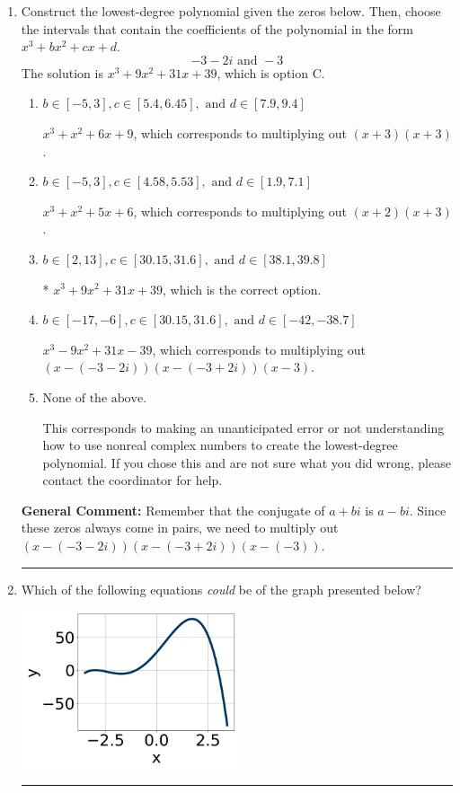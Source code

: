\documentclass{extbook}[14pt]
\newcommand{\litem}[1]{\item #1

\rule{\textwidth}{0.4pt}}
\begin{document}
\begin{enumerate}\litem{
Construct the lowest-degree polynomial given the zeros below. Then, choose the intervals that contain the coefficients of the polynomial in the form $x^3+bx^2+cx+d$.
\[ -3 - 2 i \text{ and } -3 \]The solution is \( x^{3} +9 x^{2} +31 x + 39 \), which is option C.\begin{enumerate}[label=\Alph*.]
\item \( b \in [-5, 3], c \in [5.4, 6.45], \text{ and } d \in [7.9, 9.4] \)

$x^{3} + x^{2} +6 x + 9$, which corresponds to multiplying out $(x + 3)(x + 3)$.
\item \( b \in [-5, 3], c \in [4.58, 5.53], \text{ and } d \in [1.9, 7.1] \)

$x^{3} + x^{2} +5 x + 6$, which corresponds to multiplying out $(x + 2)(x + 3)$.
\item \( b \in [2, 13], c \in [30.15, 31.6], \text{ and } d \in [38.1, 39.8] \)

* $x^{3} +9 x^{2} +31 x + 39$, which is the correct option.
\item \( b \in [-17, -6], c \in [30.15, 31.6], \text{ and } d \in [-42, -38.7] \)

$x^{3} -9 x^{2} +31 x -39$, which corresponds to multiplying out $(x-(-3 - 2 i))(x-(-3 + 2 i))(x -3)$.
\item \( \text{None of the above.} \)

This corresponds to making an unanticipated error or not understanding how to use nonreal complex numbers to create the lowest-degree polynomial. If you chose this and are not sure what you did wrong, please contact the coordinator for help.
\end{enumerate}

\textbf{General Comment:} Remember that the conjugate of $a+bi$ is $a-bi$. Since these zeros always come in pairs, we need to multiply out $(x-(-3 - 2 i))(x-(-3 + 2 i))(x-(-3))$.
}
\litem{
Which of the following equations \textit{could} be of the graph presented below?

\begin{center}
    \includegraphics[width=0.5\textwidth]{../Figures/polyGraphToFunctionA.png}
\end{center}


}
\end{enumerate}
\end{document}
